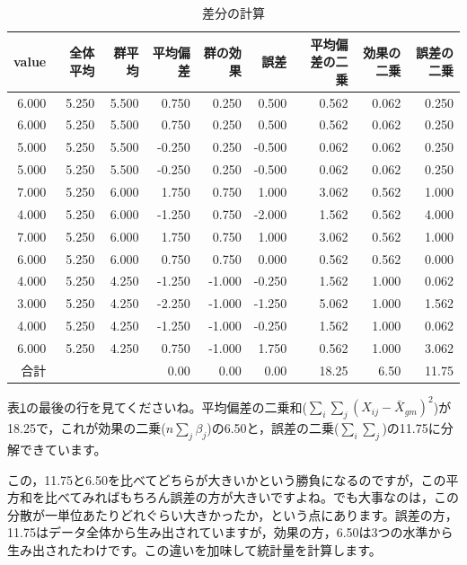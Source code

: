 \documentclass{ltjbook}
\begin{document}
\begin{table}[ht]
	\centering
	\caption{差分の計算}
	\begin{tabular}{rrrrrrrrr}
		\hline
		value & 全体平均  & 群平均   & 平均偏差   & 群の効果   & 誤差     & 平均偏差の二乗 & 効果の二乗 & 誤差の二乗 \\
		\hline
		6.000 & 5.250 & 5.500 & 0.750  & 0.250  & 0.500  & 0.562   & 0.062 & 0.250 \\
		6.000 & 5.250 & 5.500 & 0.750  & 0.250  & 0.500  & 0.562   & 0.062 & 0.250 \\
		5.000 & 5.250 & 5.500 & -0.250 & 0.250  & -0.500 & 0.062   & 0.062 & 0.250 \\
		5.000 & 5.250 & 5.500 & -0.250 & 0.250  & -0.500 & 0.062   & 0.062 & 0.250 \\
		7.000 & 5.250 & 6.000 & 1.750  & 0.750  & 1.000  & 3.062   & 0.562 & 1.000 \\
		4.000 & 5.250 & 6.000 & -1.250 & 0.750  & -2.000 & 1.562   & 0.562 & 4.000 \\
		7.000 & 5.250 & 6.000 & 1.750  & 0.750  & 1.000  & 3.062   & 0.562 & 1.000 \\
		6.000 & 5.250 & 6.000 & 0.750  & 0.750  & 0.000  & 0.562   & 0.562 & 0.000 \\
		4.000 & 5.250 & 4.250 & -1.250 & -1.000 & -0.250 & 1.562   & 1.000 & 0.062 \\
		3.000 & 5.250 & 4.250 & -2.250 & -1.000 & -1.250 & 5.062   & 1.000 & 1.562 \\
		4.000 & 5.250 & 4.250 & -1.250 & -1.000 & -0.250 & 1.562   & 1.000 & 0.062 \\
		6.000 & 5.250 & 4.250 & 0.750  & -1.000 & 1.750  & 0.562   & 1.000 & 3.062 \\
		\hline\hline
		合計    &       &       & 0.00   & 0.00   & 0.00   & 18.25   & 6.50  & 11.75 \\\hline
	\end{tabular}
	\label{tbl::21_04}
\end{table}
表\ref{tbl::21_04}の最後の行を見てくださいね。平均偏差の二乗和($\sum_{i}\sum_{j} (X_{ij} - \bar{X}_{gm})^2$)が18.25で，これが効果の二乗($n\sum_j \beta_j$)の6.50と，誤差の二乗($ \sum_{i}\sum_{j} $)の11.75に分解できています。

この，11.75と6.50を比べてどちらが大きいかという勝負になるのですが，この平方和を比べてみればもちろん誤差の方が大きいですよね。でも大事なのは，この分散が一単位あたりどれぐらい大きかったか，という点にあります。誤差の方，11.75はデータ全体から生み出されていますが，効果の方，6.50は3つの水準から生み出されたわけです。この違いを加味して統計量を計算します。
\end{document}
